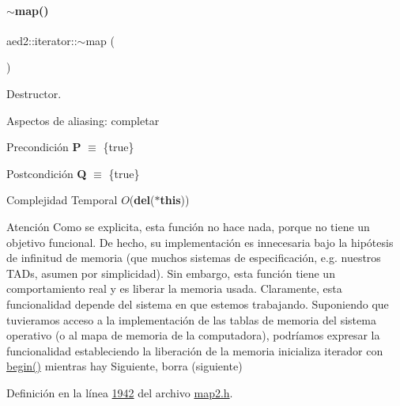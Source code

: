 \paragraph{\texorpdfstring{$\sim$map()}{~map()}}
{\footnotesize\ttfamily aed2\+::iterator\+::$\sim$map (\begin{DoxyParamCaption}{ }\end{DoxyParamCaption})\hspace{0.3cm}{\ttfamily [inline]}}



Destructor. 

\begin{DoxyParagraph}{Aspectos de aliasing\+:}
completar
\end{DoxyParagraph}
\begin{DoxyPrecond}{Precondición}
{\bfseries P} $\equiv$ \{true\} 
\end{DoxyPrecond}
\begin{DoxyPostcond}{Postcondición}
{\bfseries Q} $\equiv$ \{true\}
\end{DoxyPostcond}

\begin{DoxyDescription}
\item[Complejidad Temporal]$O$({\bfseries del}({\bfseries $\ast$this}))
\end{DoxyDescription}

\begin{DoxyAttention}{Atención}
Como se explicita, esta función no hace nada, porque no tiene un objetivo funcional. De hecho, su implementación es innecesaria bajo la hipótesis de infinitud de memoria (que muchos sistemas de especificación, e.\+g. nuestros T\+A\+Ds, asumen por simplicidad). Sin embargo, esta función tiene un comportamiento real y es liberar la memoria usada. Claramente, esta funcionalidad depende del sistema en que estemos trabajando. Suponiendo que tuvieramos acceso a la implementación de las tablas de memoria del sistema operativo (o al mapa de memoria de la computadora), podríamos expresar la funcionalidad estableciendo la liberación de la memoria inicializa iterador con \hyperlink{classaed2_1_1iterator_af8901de173468531c58458b581d345a6_af8901de173468531c58458b581d345a6}{begin()} mientras hay Siguiente, borra (siguiente) 
\end{DoxyAttention}


Definición en la línea \hyperlink{map2_8h_source_l01942}{1942} del archivo \hyperlink{map2_8h_source}{map2.\+h}.



